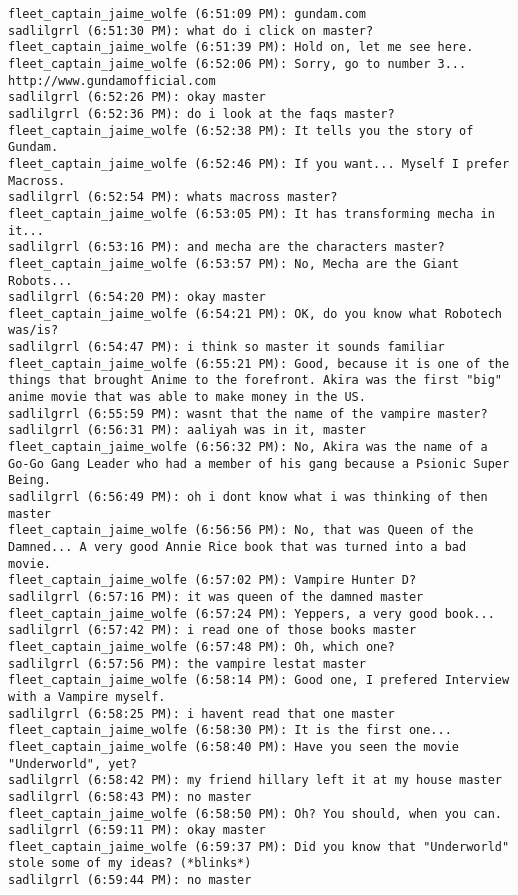\begin{verbatim}
fleet_captain_jaime_wolfe (6:51:09 PM): gundam.com
sadlilgrrl (6:51:30 PM): what do i click on master?
fleet_captain_jaime_wolfe (6:51:39 PM): Hold on, let me see here.
fleet_captain_jaime_wolfe (6:52:06 PM): Sorry, go to number 3... http://www.gundamofficial.com
sadlilgrrl (6:52:26 PM): okay master
sadlilgrrl (6:52:36 PM): do i look at the faqs master?
fleet_captain_jaime_wolfe (6:52:38 PM): It tells you the story of Gundam.
fleet_captain_jaime_wolfe (6:52:46 PM): If you want... Myself I prefer Macross.
sadlilgrrl (6:52:54 PM): whats macross master?
fleet_captain_jaime_wolfe (6:53:05 PM): It has transforming mecha in it...
sadlilgrrl (6:53:16 PM): and mecha are the characters master?
fleet_captain_jaime_wolfe (6:53:57 PM): No, Mecha are the Giant Robots...
sadlilgrrl (6:54:20 PM): okay master
fleet_captain_jaime_wolfe (6:54:21 PM): OK, do you know what Robotech was/is?
sadlilgrrl (6:54:47 PM): i think so master it sounds familiar
fleet_captain_jaime_wolfe (6:55:21 PM): Good, because it is one of the things that brought Anime to the forefront. Akira was the first "big" anime movie that was able to make money in the US.
sadlilgrrl (6:55:59 PM): wasnt that the name of the vampire master?
sadlilgrrl (6:56:31 PM): aaliyah was in it, master
fleet_captain_jaime_wolfe (6:56:32 PM): No, Akira was the name of a Go-Go Gang Leader who had a member of his gang because a Psionic Super Being.
sadlilgrrl (6:56:49 PM): oh i dont know what i was thinking of then master
fleet_captain_jaime_wolfe (6:56:56 PM): No, that was Queen of the Damned... A very good Annie Rice book that was turned into a bad movie.
fleet_captain_jaime_wolfe (6:57:02 PM): Vampire Hunter D?
sadlilgrrl (6:57:16 PM): it was queen of the damned master
fleet_captain_jaime_wolfe (6:57:24 PM): Yeppers, a very good book...
sadlilgrrl (6:57:42 PM): i read one of those books master
fleet_captain_jaime_wolfe (6:57:48 PM): Oh, which one?
sadlilgrrl (6:57:56 PM): the vampire lestat master
fleet_captain_jaime_wolfe (6:58:14 PM): Good one, I prefered Interview with a Vampire myself.
sadlilgrrl (6:58:25 PM): i havent read that one master
fleet_captain_jaime_wolfe (6:58:30 PM): It is the first one...
fleet_captain_jaime_wolfe (6:58:40 PM): Have you seen the movie "Underworld", yet?
sadlilgrrl (6:58:42 PM): my friend hillary left it at my house master
sadlilgrrl (6:58:43 PM): no master
fleet_captain_jaime_wolfe (6:58:50 PM): Oh? You should, when you can.
sadlilgrrl (6:59:11 PM): okay master
fleet_captain_jaime_wolfe (6:59:37 PM): Did you know that "Underworld" stole some of my ideas? (*blinks*)
sadlilgrrl (6:59:44 PM): no master

\end{verbatim}
